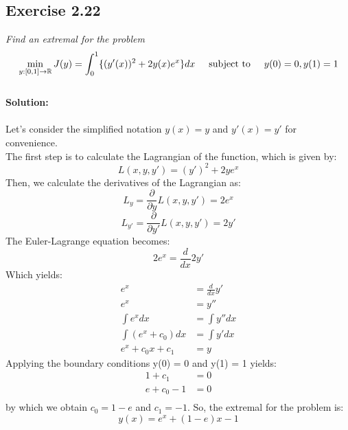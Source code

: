 \subsection{Exercise 2.22}
\emph{Find an extremal for the problem}
\begin{equation}
    \min\limits_{y:[0,1] \to \mathbb{R}} J(y) = \int_0^1 \{ (y'(x))^2 + 2y(x)e^x \} dx \hspace{0.5cm} \text{subject to} \hspace{0.5cm} y(0) = 0, y(1) = 1 
\end{equation}
\\
\textbf{Solution:}\\
\\
Let's consider the simplified notation $y(x) = y$ and $y'(x) = y'$ for convenience.\\
The first step is to calculate the Lagrangian of the function, which is given by:
\begin{equation}
    L(x, y, y') = (y')^2 +2ye^x
\end{equation}
Then, we calculate the derivatives of the Lagrangian as:
\begin{equation}
    L_y = \frac{\partial}{\partial y } L(x, y ,y') = 2e^x
\end{equation}
\begin{equation}
    L_{y'} = \frac{\partial}{\partial y' } L(x, y ,y') = 2y'
\end{equation}
The Euler-Lagrange equation becomes:
\begin{equation}
    2e^x = \frac{d}{d x}2 y'
\end{equation}
Which yields:
\begin{align}
    e^x &= \frac{d}{d x} y'\\
    e^x &= y'' \\
    \int e^x dx &= \int y'' dx\\
    \int \left( e^x + c_0 \right) dx &= \int y' dx \\
    e^x + c_0x + c_1 &= y
\end{align}
Applying the boundary conditions y(0) = 0 and y(1) = 1  yields:
\begin{align}
    1 + c_1 &= 0 \\
    e +c_0 -1 &= 0 \\
\end{align}
by which we obtain $ c_0 = 1 -e$ and $ c_1 = -1$. So, the extremal for the problem is:
\begin{equation}
    y(x) = e^x  + (1-e) x -1 
\end{equation}
\QEDB

